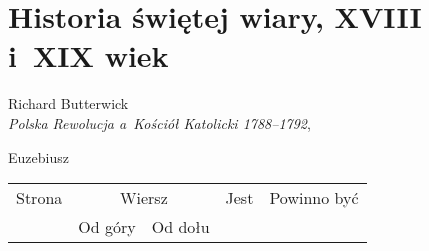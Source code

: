 \documentclass[a4paper,11pt]{article}
\numberwithin{equation}{section}
\begin{document}
\VerSpaceSix













\newpage

\section{Historia świętej wiary, XVIII i~XIX wiek}



{ %
  Richard Butterwick \\
  \textit{Polska Rewolucja a~Kościół Katolicki 1788--1792},
  \cite{ButterwickPolskaRewolucjaAKosciolKatolicki2012}}

\vspace{0em}



\vspace{0em}


\noindent
{} Euzebiusz \\




\begin{center}

  \begin{tabular}{|c|c|c|c|c|}
    \hline
    Strona & \multicolumn{2}{c|}{Wiersz} & Jest
                              & Powinno być \\ \cline{2-3}
    & Od góry & Od dołu & & \\
    \hline
    \hline
  \end{tabular}

\end{center}

\VerSpaceSix












\newpage
\end{document}
